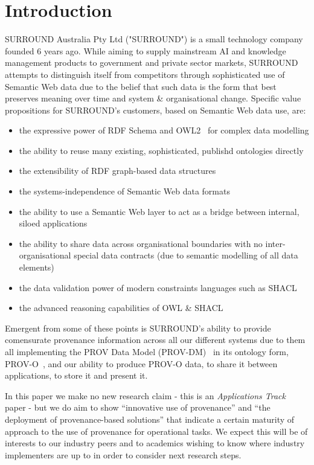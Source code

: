 \documentclass[letterpaper,twocolumn,10pt]{article}
\begin{document}
\section{Introduction}
SURROUND Australia Pty Ltd ("SURROUND") is a small technology company founded 6 years ago. While
aiming to supply mainstream AI and knowledge management products to government and private
sector markets, SURROUND attempts to distinguish itself from competitors through sophisticated use
of Semantic Web data due to the belief that such data is the form that best preserves meaning 
over time and system \& organisational change. Specific value propositions for SURROUND's customers, 
based on Semantic Web data use, are:

\begin{itemize}
  \item the expressive power of RDF Schema and OWL2~\cite{dan_brickley_rdf_2014,w3c_owl_working_group_owl_2012} for complex data modelling
  \item the ability to reuse many existing, sophisticated, publishd ontologies directly
  \item the extensibility of RDF graph-based data structures
  \item the systems-independence of Semantic Web data formats
  \item the ability to use a Semantic Web layer to act as a bridge between internal, siloed applications
  \item the ability to share data across organisational boundaries with no inter-organisational special data contracts (due to semantic modelling of all data elements)
  \item the data validation power of modern constraints languages such as SHACL~\cite{knublauch_shapes_2017}
  \item the advanced reasoning capabilities of OWL \& SHACL
\end{itemize}

Emergent from some of these points is SURROUND's ability to provide comensurate provenance information 
across all our different systems due to them all implementing the PROV Data Model (PROV-DM)~\cite{moreau_prov-dm_2013}
in its ontology form, PROV-O~\cite{lebo_prov-o:_2013}, and our ability to produce PROV-O data, to share 
it between applications, to store it and present it.

In this paper we make no new research claim - this is an \textit{Applications Track} paper - but we do aim 
to show ``innovative use of provenance'' and ``the deployment of provenance-based solutions'' that indicate
a certain maturity of approach to the use of provenance for operational tasks. We expect this will be of 
interests to our industry peers and to academics wishing to know where industry implementers are up to
in order to consider next research steps.
\end{document}
